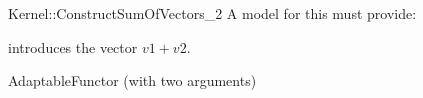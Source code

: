 \begin{ccRefFunctionObjectConcept}{Kernel::ConstructSumOfVectors_2}
A model for this must provide:




            {introduces the vector $v1 + v2$.}


\ccRefines
AdaptableFunctor (with two arguments)

\ccSeeAlso
{}\\

\end{ccRefFunctionObjectConcept}
